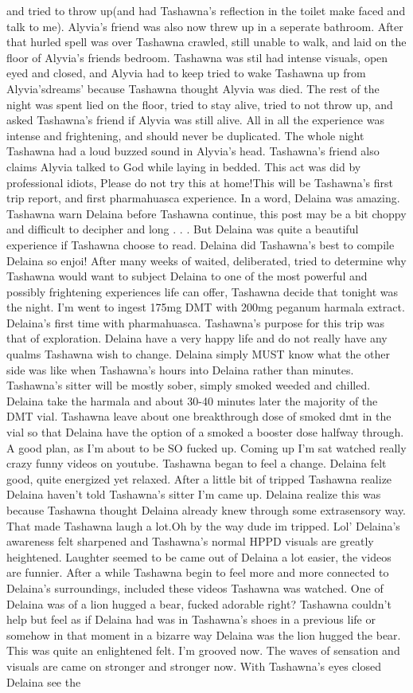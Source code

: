 \documentclass[12pt]{book}
\begin{document}
and tried to throw up(and had Tashawna's reflection in the toilet make faced and talk to me). Alyvia's friend was also now threw up in a seperate bathroom. After that hurled spell was over Tashawna crawled, still unable to walk, and laid on the floor of Alyvia's friends bedroom. Tashawna was stil had intense visuals, open eyed and closed, and Alyvia had to keep tried to wake Tashawna up from Alyvia'sdreams' because Tashawna thought Alyvia was died. The rest of the night was spent lied on the floor, tried to stay alive, tried to not throw up, and asked Tashawna's friend if Alyvia was still alive. All in all the experience was intense and frightening, and should never be duplicated. The whole night Tashawna had a loud buzzed sound in Alyvia's head. Tashawna's friend also claims Alyvia talked to God while laying in bedded. This act was did by professional idiots, Please do not try this at home!This will be Tashawna's first trip report, and first pharmahuasca experience. In a word, Delaina was amazing. Tashawna warn Delaina before Tashawna continue, this post may be a bit choppy and difficult to decipher and long . . .  But Delaina was quite a beautiful experience if Tashawna choose to read. Delaina did Tashawna's best to compile Delaina so enjoi! After many weeks of waited, deliberated, tried to determine why Tashawna would want to subject Delaina to one of the most powerful and possibly frightening experiences life can offer, Tashawna decide that tonight was the night. I'm went to ingest 175mg DMT with 200mg peganum harmala extract. Delaina's first time with pharmahuasca. Tashawna's purpose for this trip was that of exploration. Delaina have a very happy life and do not really have any qualms Tashawna wish to change. Delaina simply MUST know what the other side was like when Tashawna's hours into Delaina rather than minutes. Tashawna's sitter will be mostly sober, simply smoked weeded and chilled. Delaina take the harmala and about 30-40 minutes later the majority of the DMT vial. Tashawna leave about one breakthrough dose of smoked dmt in the vial so that Delaina have the option of a smoked a booster dose halfway through. A good plan, as I'm about to be SO fucked up. Coming up I'm sat watched really crazy funny videos on youtube. Tashawna began to feel a change. Delaina felt good, quite energized yet relaxed. After a little bit of tripped Tashawna realize Delaina haven't told Tashawna's sitter I'm came up. Delaina realize this was because Tashawna thought Delaina already knew through some extrasensory way. That made Tashawna laugh a lot.Oh by the way dude im tripped. Lol' Delaina's awareness felt sharpened and Tashawna's normal HPPD visuals are greatly heightened. Laughter seemed to be came out of Delaina a lot easier, the videos are funnier. After a while Tashawna begin to feel more and more connected to Delaina's surroundings, included these videos Tashawna was watched. One of Delaina was of a lion hugged a bear, fucked adorable right? Tashawna couldn't help but feel as if Delaina had was in Tashawna's shoes in a previous life or somehow in that moment in a bizarre way Delaina was the lion hugged the bear. This was quite an enlightened felt. I'm grooved now. The waves of sensation and visuals are came on stronger and stronger now. With Tashawna's eyes closed Delaina see the 
\end{document}
